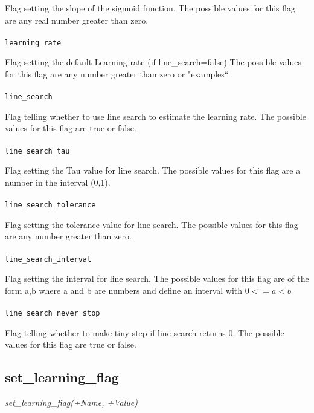\documentclass[a4paper,12pt]{article}
\begin{document}
Flag setting the slope of the sigmoid function.
The possible values for this flag are any real number greater than zero.
\paragraph{}
\texttt{learning\_rate}

Flag setting the default Learning rate (if line\_search=false)
The possible values for this flag are any number greater than zero or "examples``
\paragraph{}
\texttt{line\_search}

Flag telling whether to use line search to estimate the learning rate.
The possible values for this flag are true or false.
\paragraph{}
\texttt{line\_search\_tau}

Flag setting the Tau value for line search.
The possible values for this flag are a number in the interval (0,1).
\paragraph{}
\texttt{line\_search\_tolerance}

Flag setting the tolerance value for line search.
The possible values for this flag are any number greater than zero.
\paragraph{}
\texttt{line\_search\_interval}

Flag setting the interval for line search.
The possible values for this flag are of the form a,b where a and b are numbers and define an interval with $0<=a<b$
\paragraph{}
\texttt{line\_search\_never\_stop}

Flag telling whether to make tiny step if line search returns 0.
The possible values for this flag are true or false.

\subsection{set\_learning\_flag}
\textit{set\_learning\_flag(+Name, +Value)}
\end{document}

